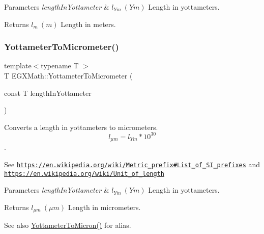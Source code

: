 \begin{DoxyParams}{Parameters}
{\em length\+In\+Yottameter} & $ l_{Ym}\ (Ym)$ Length in yottameters. \\
\hline
\end{DoxyParams}
\begin{DoxyReturn}{Returns}
$ l_{m}\ (m)$ Length in meters. 
\end{DoxyReturn}
\mbox{\label{group___e_g_x_math-_conversions-_length_conversions-_s_i-_yottameter-_s_i_ga25310d8ba2830f305680927ac3c13c38}} 
\subsubsection{\texorpdfstring{Yottameter\+To\+Micrometer()}{YottameterToMicrometer()}}
{\footnotesize\ttfamily template$<$typename T $>$ \\
T E\+G\+X\+Math\+::\+Yottameter\+To\+Micrometer (\begin{DoxyParamCaption}\item[{const T}]{length\+In\+Yottameter }\end{DoxyParamCaption})}



Converts a length in yottameters to micrometers. \[ l_{\mu m}=l_{Ym} * 10^{30} \]. 

See \href{https://en.wikipedia.org/wiki/Metric_prefix#List_of_SI_prefixes}{\tt https\+://en.\+wikipedia.\+org/wiki/\+Metric\+\_\+prefix\#\+List\+\_\+of\+\_\+\+S\+I\+\_\+prefixes} and \href{https://en.wikipedia.org/wiki/Unit_of_length}{\tt https\+://en.\+wikipedia.\+org/wiki/\+Unit\+\_\+of\+\_\+length} 
\begin{DoxyParams}{Parameters}
{\em length\+In\+Yottameter} & $ l_{Ym}\ (Ym)$ Length in yottameters. \\
\hline
\end{DoxyParams}
\begin{DoxyReturn}{Returns}
$ l_{\mu m}\ (\mu m)$ Length in micrometers. 
\end{DoxyReturn}
\begin{DoxySeeAlso}{See also}
\mbox{\hyperlink{group___e_g_x_math-_conversions-_length_conversions-_s_i-_yottameter-_non-_s_i_gaad96d515763b1dfbcd968020e1b97de4}{Yottameter\+To\+Micron()}} for alias. 
\end{DoxySeeAlso}
\mbox{\label{group___e_g_x_math-_conversions-_length_conversions-_s_i-_yottameter-_s_i_ga0e68b787003f09883a6b15b92b003a07}} 
